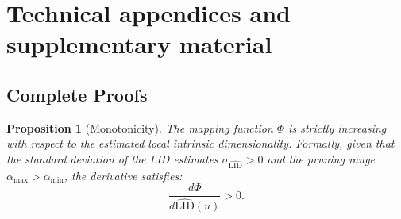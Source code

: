 \documentclass{article}
\theoremstyle{plain}
\newtheorem{proposition}[theorem]{Proposition}
\theoremstyle{definition}
\theoremstyle{remark}
\begin{document}
\clearpage
\appendix

\section{Technical appendices and supplementary material}

\subsection{Complete Proofs}
\label{appendix:proofs}

\begin{proposition}[Monotonicity]\label{proof:mono}
The mapping function $\Phi$ is strictly increasing with respect to the estimated local intrinsic dimensionality. Formally, given that the standard deviation of the LID estimates $\sigma_{\widehat{\text{LID}}} > 0$ and the pruning range $\alpha_{\max} > \alpha_{\min}$, the derivative satisfies:
\begin{equation}
    \frac{d \Phi}{d \widehat{\text{LID}}(u)} > 0.
\end{equation}
\end{proposition}
\end{document}
